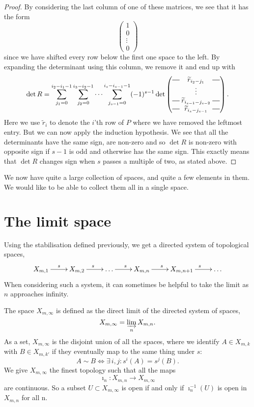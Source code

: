 \begin{proof}
  By considering the last column of one of these matrices, we see that
  it has the form
  \[
  \begin{pmatrix}
    1 \\
    0 \\
    \vdots \\
    0
  \end{pmatrix} \]
  since we have shifted every row below the first one space to the
  left. By expanding the determinant using this column, we remove it and
  end up with
  \[ \det R = \sum_{j_1 = 0}^{i_2-i_1-1}\sum_{j_2 = 0}^{i_3-i_2-1}
  \dots \sum_{j_{s-1}=0}^{i_s-i_{s-1}-1} (-1)^{s-1} \det
  \begin{pmatrix}
    \matrow{\widetilde{r}_{i_2-j_1}} \\
    & \hspace{-0.75em} \vdots & \\
    \matrow{\widetilde{r}_{i_{s-1}-j_{s-2}}} \\
    \matrow{\widetilde{r}_{i_s-j_{s-1}}}
  \end{pmatrix}. \]
  Here we use $\widetilde{r}_i$ to denote the $i$'th row of $P$ where we
  have removed the leftmost entry. But we can now apply the induction
  hypothesis. We see that all the determinants have the same sign, are
  non-zero and
  so $\det R$ is non-zero with opposite sign if $s-1$ is odd and
  otherwise has the
  same sign. This exactly means that $\det R$ changes sign
  when $s$ passes a multiple of two, as stated above. 
\end{proof}

We now have quite a large collection of spaces, and quite a few
elements in them. We would like to be able to collect them all in a
single space. 

\section{The limit space}
\label{sec:rum-gr}

Using the stabilisation defined previously, we get a directed system
of topological spaces,
\[ \xymatrix{X_{m,1} \ar[r]^s & X_{m,2} \ar[r]^s & \dots \ar[r]^s &
  X_{m,n} \ar[r]^s & X_{m,n+1} \ar[r]^s & \dots } \]
When considering such a system, it can sometimes be helpful to
take the limit as $n$ approaches infinity.

\begin{definition}
  The space $X_{m,\infty}$ is defined as the direct limit of the
  directed system of spaces,
  \[ X_{m,\infty} = \varinjlim_n X_{m,n}. \]
  As a set, $X_{m,\infty}$ is the disjoint union of all the spaces,
  where we identify $A \in X_{m,k}$ with $B \in X_{m,k'}$ if they
  eventually map to the same thing under $s$:
  \[ A \sim B \iff \exists\, i,j : s^i(A) = s^j(B). \]
  We give $X_{m,\infty}$ the finest topology such that all the
  maps 
  \[ \imath_n : X_{m,n} \to X_{m,\infty} \]
  are continuous. So a subset $U \subset X_{m,\infty}$ is open if and
  only if $\imath_n^{-1}(U)$ is open in $X_{m,n}$ for all n. 
\end{definition}

